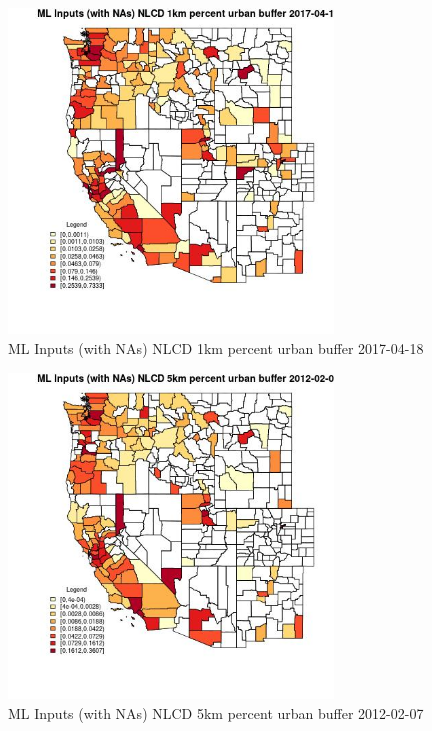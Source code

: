 \begin{figure} 
\centering  
\includegraphics[width=0.77\textwidth]{Code_Outputs/Report_ML_input_PM25_Step4_part_f_de_duplicated_aveswNAs_CountyNLCD_1km_percent_urban_bufferMean2017-04-18.jpg} 
\caption{\label{fig:Report_ML_input_PM25_Step4_part_f_de_duplicated_aveswNAsCountyNLCD_1km_percent_urban_bufferMean2017-04-18}ML Inputs (with NAs) NLCD 1km percent urban buffer 2017-04-18} 
\end{figure} 
 

\begin{figure} 
\centering  
\includegraphics[width=0.77\textwidth]{Code_Outputs/Report_ML_input_PM25_Step4_part_f_de_duplicated_aveswNAs_CountyNLCD_5km_percent_urban_bufferMean2012-02-07.jpg} 
\caption{\label{fig:Report_ML_input_PM25_Step4_part_f_de_duplicated_aveswNAsCountyNLCD_5km_percent_urban_bufferMean2012-02-07}ML Inputs (with NAs) NLCD 5km percent urban buffer 2012-02-07} 
\end{figure} 
 

